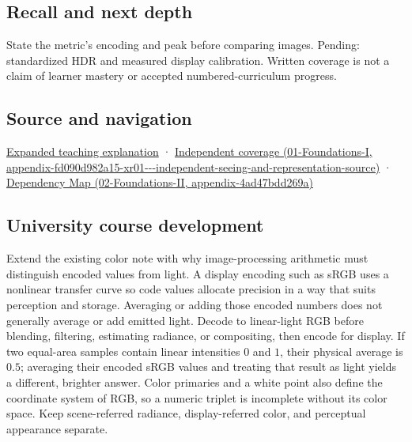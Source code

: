 \subsection{Recall and next depth}\label{appendix-a9f83ad40792-recall-and-next-depth}

State the metric's encoding and peak before comparing images. Pending: standardized HDR and measured display calibration. Written coverage is not a claim of learner mastery or accepted numbered-curriculum progress.

\subsection{Source and navigation}\label{appendix-a9f83ad40792-source-and-navigation}

\href{Continuous\%20Notes/University\%20-\%20Worlds,\%20Images\%20and\%20Inference\%20-\%20Graphics,\%20Vision\%20and\%20Photography\#Encoded\%20RGB\%20must\%20not\%20masquerade\%20as\%20linear\%20light}{Expanded teaching explanation} · \href{../01-Foundations-I/main.pdf\#nameddest=appendix-fd090d982a15-xr01---independent-seeing-and-representation-source}{Independent coverage (01-Foundations-I, appendix-fd090d982a15-xr01-\/-\/-independent-seeing-and-representation-source)} · \href{../02-Foundations-II/main.pdf\#nameddest=appendix-4ad47bdd269a}{Dependency Map (02-Foundations-II, appendix-4ad47bdd269a)}

\subsection{University course development}\label{appendix-a9f83ad40792-university-course-development}

Extend the existing color note with why image-processing arithmetic must distinguish encoded values from light. A display encoding such as sRGB uses a nonlinear transfer curve so code values allocate precision in a way that suits perception and storage. Averaging or adding those encoded numbers does not generally average or add emitted light. Decode to linear-light RGB before blending, filtering, estimating radiance, or compositing, then encode for display. If two equal-area samples contain linear intensities \(0\) and \(1\), their physical average is \(0.5\); averaging their encoded sRGB values and treating that result as light yields a different, brighter answer. Color primaries and a white point also define the coordinate system of RGB, so a numeric triplet is incomplete without its color space. Keep scene-referred radiance, display-referred color, and perceptual appearance separate.

